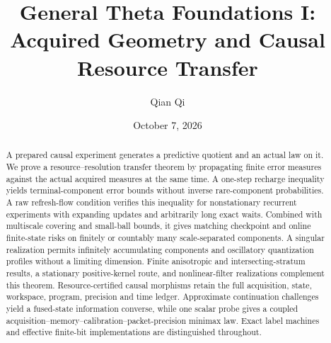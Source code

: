 \documentclass[11pt]{amsart}
\title[Acquired geometry and causal resource transfer]{General Theta Foundations I:\\Acquired Geometry and Causal Resource Transfer}
\author{Qian Qi}
\date{October 7, 2026}
\theoremstyle{definition}
\begin{document}
\begin{abstract}
A prepared causal experiment generates a predictive quotient and an actual law on it. We prove a resource--resolution transfer theorem by propagating finite error measures against the actual acquired measures at the same time. A one-step recharge inequality yields terminal-component error bounds without inverse rare-component probabilities. A raw refresh-flow condition verifies this inequality for nonstationary recurrent experiments with expanding updates and arbitrarily long exact waits. Combined with multiscale covering and small-ball bounds, it gives matching checkpoint and online finite-state risks on finitely or countably many scale-separated components. A singular realization permits infinitely accumulating components and oscillatory quantization profiles without a limiting dimension. Finite anisotropic and intersecting-stratum results, a stationary positive-kernel route, and nonlinear-filter realizations complement this theorem. Resource-certified causal morphisms retain the full acquisition, state, workspace, program, precision and time ledger. Approximate continuation challenges yield a fused-state information converse, while one scalar probe gives a coupled acquisition--memory--calibration--packet-precision minimax law. Exact label machines and effective finite-bit implementations are distinguished throughout.
\end{abstract}
\maketitle












\appendix

\clearpage

\end{document}
